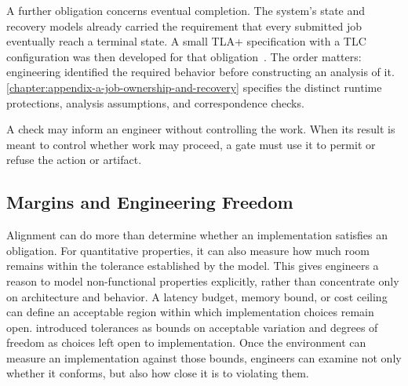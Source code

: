 A further obligation concerns eventual completion. The system's state and recovery models already carried the requirement that every submitted job eventually reach a terminal state. A small TLA+ specification with a TLC configuration was then developed for that obligation~\citep{lamport2002}. The order matters: engineering identified the required behavior before constructing an analysis of it. \autoref{chapter:appendix-a-job-ownership-and-recovery} specifies the distinct runtime protections, analysis assumptions, and correspondence checks.


A check may inform an engineer without controlling the work. When its result is meant to control whether work may proceed, a gate must use it to permit or refuse the action or artifact.

\subsection{Margins and Engineering Freedom}\label{heading:margin-and-engineering-freedom}



Alignment can do more than determine whether an implementation satisfies an obligation. For quantitative properties, it can also measure how much room remains within the tolerance established by the model. This gives engineers a reason to model non-functional properties explicitly, rather than concentrate only on architecture and behavior. A latency budget, memory bound, or cost ceiling can define an acceptable region within which implementation choices remain open.  introduced tolerances as bounds on acceptable variation and degrees of freedom as choices left open to implementation. Once the environment can measure an implementation against those bounds, engineers can examine not only whether it conforms, but also how close it is to violating them.

